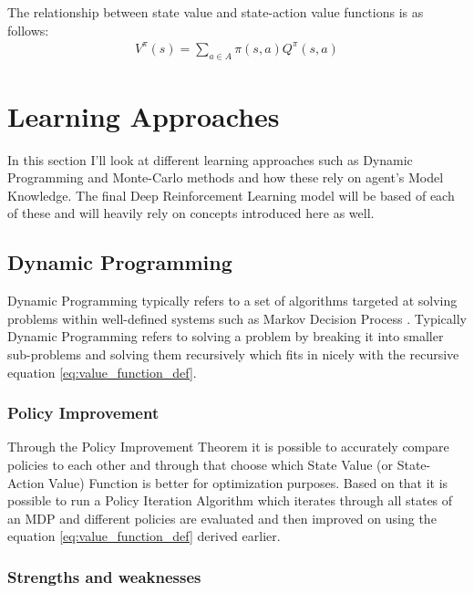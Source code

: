 The relationship between state value and state-action value functions is as follows:
\begin{align}
    V^{\pi}(s) = \sum_{a \in A} \pi(s, a) Q^{\pi}(s, a) 
\end{align}


\section{Learning Approaches}

In this section I'll look at different learning approaches such
as Dynamic Programming and Monte-Carlo methods and how 
these rely on agent's Model Knowledge. The final Deep Reinforcement Learning model will be based of each of these 
and will heavily rely on concepts introduced here as well. 

\subsection{Dynamic Programming}

Dynamic Programming typically refers to a set of algorithms targeted at solving problems within well-defined systems such as Markov Decision Process \cite{lecture_dp}. Typically Dynamic Programming refers to solving a problem by breaking it into smaller sub-problems and solving them recursively which 
fits in nicely with the recursive equation \ref{eq:value_function_def}.

\subsubsection{Policy Improvement}

Through the Policy Improvement Theorem \cite{lecture_dp} it is 
possible to accurately compare policies to each other and 
through that choose which State Value (or State-Action Value) Function is better for optimization purposes. Based on that it 
is possible to run a Policy Iteration Algorithm \cite{lecture_dp} which iterates
through all states of an MDP and different policies are evaluated and then improved on using the equation \ref{eq:value_function_def} derived earlier.

\subsubsection{Strengths and weaknesses}

